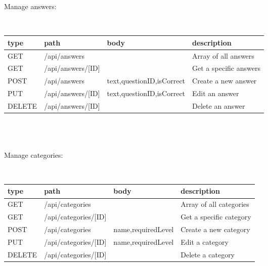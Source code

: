 \noindent Manage answers:
\begin{small}
\\ \hspace*{-1cm} \begin{tabular}{|p{1.5cm}| p{4.5cm} | p{2.5cm} | p{6cm} |}
    \hline
    type & path & body & description \\ \hline
    GET & /api/answers & & Array of all answers \\ \hline
    GET & /api/answers/[ID] & & Get a specific answers  \\ \hline
    POST & /api/answers & text,\newline questionID,\newline isCorrect & Create a new answer  \\ \hline
    PUT & /api/answers/[ID] &text,\newline questionID,\newline isCorrect & Edit an answer  \\ \hline
    DELETE & /api/answers/[ID] & & Delete an answer  \\ \hline
   \end{tabular}
\end{small}\\\\\\
\noindent Manage categories:
\begin{small}
\\ \hspace*{-1cm} \begin{tabular}{|p{1.5cm}| p{4.5cm} | p{2.5cm} | p{6cm} |}
    \hline
    type & path & body & description \\ \hline
    GET & /api/categories & & Array of all categories \\ \hline
    GET & /api/categories/[ID] & & Get a specific category  \\ \hline
    POST & /api/categories & name,\newline requiredLevel & Create a new category  \\ \hline
    PUT & /api/categories/[ID] &name,\newline requiredLevel & Edit a category  \\ \hline
    DELETE & /api/categories/[ID] & & Delete a category  \\ \hline
   \end{tabular}
\end{small}\\\\\\
